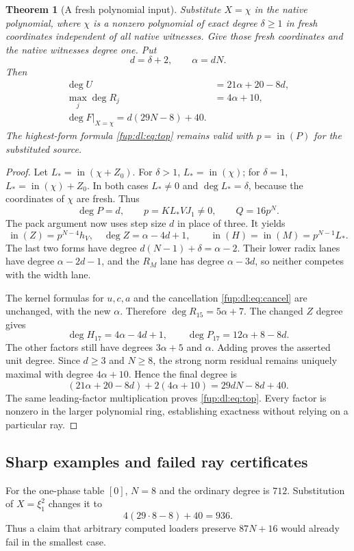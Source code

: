 \documentclass[11pt,letterpaper]{article}
\newtheorem{theorem}{Theorem}[section]
\theoremstyle{definition}\newtheorem{definition}[theorem]{Definition}
\theoremstyle{remark}\newtheorem{remark}[theorem]{Remark}
\newcommand{\topf}[1]{\operatorname{in}(#1)}
\begin{document}
\begin{theorem}[A fresh polynomial input]\label{fup:dl:thm:fresh}
Substitute $X=\chi$ in the native polynomial, where $\chi$ is a nonzero polynomial of exact degree $\delta\ge1$ in fresh coordinates independent of all native witnesses. Give those fresh coordinates and the native witnesses degree one. Put
\[
 d=\delta+2,\qquad\alpha=dN.
\]
Then
\begin{align*}
 \deg U&=21\alpha+20-8d,\\
 \max_j\deg R_j&=4\alpha+10,\\
 \boxed{\deg F\bigl\vert_{X=\chi}=d(29N-8)+40.}
\end{align*}
The highest-form formula \eqref{fup:dl:eq:top} remains valid with $p=\topf{P}$ for the substituted source.
\end{theorem}
\begin{proof}
Let $L_*=\topf{\chi+Z_0}$. For $\delta>1$, $L_*=\topf{\chi}$; for $\delta=1$, $L_*=\topf{\chi}+Z_0$. In both cases $L_*\ne0$ and $\deg L_*=\delta$, because the coordinates of $\chi$ are fresh. Thus
\[
 \deg P=d,\qquad p=K L_*VJ_1\ne0,\qquad Q=16p^N.
\]
The pack argument now uses step size $d$ in place of three. It yields
\[
 \topf{Z}=p^{N-4}h_V,\quad\deg Z=\alpha-4d+1,
 \qquad\topf{H}=\topf{M}=p^{N-1}L_*.
\]
The last two forms have degree $d(N-1)+\delta=\alpha-2$. Their lower radix lanes have degree $\alpha-2d-1$, and the $R_M$ lane has degree $\alpha-3d$, so neither competes with the width lane.

The kernel formulas for $u,c,a$ and the cancellation \eqref{fup:dl:eq:cancel} are unchanged, with the new $\alpha$. Therefore $\deg R_{15}=5\alpha+7$. The changed $Z$ degree gives
\[
 \deg H_{17}=4\alpha-4d+1,\qquad
 \deg P_{17}=12\alpha+8-8d.
\]
The other factors still have degrees $3\alpha+5$ and $\alpha$. Adding proves the asserted unit degree. Since $d\ge3$ and $N\ge8$, the strong norm residual remains uniquely maximal with degree $4\alpha+10$. Hence the final degree is
\[
 (21\alpha+20-8d)+2(4\alpha+10)
 =29dN-8d+40.
\]
The same leading-factor multiplication proves \eqref{fup:dl:eq:top}. Every factor is nonzero in the larger polynomial ring, establishing exactness without relying on a particular ray.
\end{proof}

\subsection{Sharp examples and failed ray certificates}
For the one-phase table $[0]$, $N=8$ and the ordinary degree is $712$. Substitution of $X=\xi_1^2$ changes it to
\[
 4(29\cdot8-8)+40=936.
\]
Thus a claim that arbitrary computed loaders preserve $87N+16$ would already fail in the smallest case.
\end{document}
